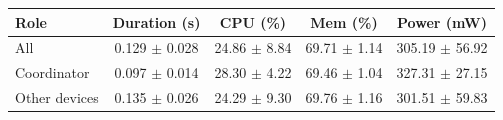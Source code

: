 \begin{tabular}{lcccc}
\hline
\textbf{Role} & \textbf{Duration (s)} & \textbf{CPU (\%)} & \textbf{Mem (\%)} & \textbf{Power (mW)} \\
\hline
All & 0.129 $\pm$ 0.028 & 24.86 $\pm$ 8.84 & 69.71 $\pm$ 1.14 & 305.19 $\pm$ 56.92 \\
Coordinator & 0.097 $\pm$ 0.014 & 28.30 $\pm$ 4.22 & 69.46 $\pm$ 1.04 & 327.31 $\pm$ 27.15 \\
Other devices & 0.135 $\pm$ 0.026 & 24.29 $\pm$ 9.30 & 69.76 $\pm$ 1.16 & 301.51 $\pm$ 59.83 \\
\hline
\end{tabular}
